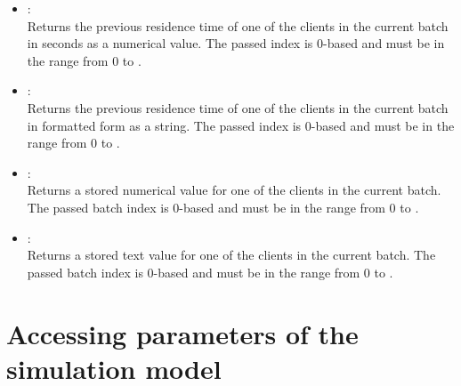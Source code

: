 \begin{itemize}
\item
{}:\\
Returns the previous residence time of one of the clients in the current batch in seconds as a numerical value.
The passed index is 0-based and must be in the range from 0 to .

\item
{}:\\
Returns the previous residence time of one of the clients in the current batch in formatted form as a string.
The passed index is 0-based and must be in the range from 0 to .

\item
{}:\\
Returns a stored numerical value for one of the clients in the current batch.
The passed batch index is 0-based and must be in the range from 0 to .

\item
{}:\\
Returns a stored text value for one of the clients in the current batch.
The passed batch index is 0-based and must be in the range from 0 to .

\end{itemize}

\section{Accessing parameters of the simulation model}

